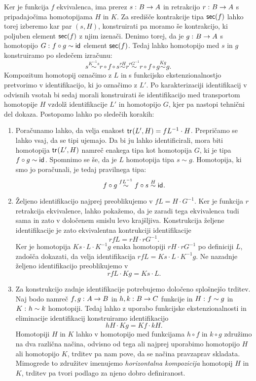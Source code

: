 \begin{dokaz}
  Ker je funkcija \(f\) ekvivalenca, ima prerez \(s \,\colon B \to A\) in retrakcijo \(r \,\colon B \to A\) s pripadajočima homotopijama \(H\) in \(K\). Za središče kontrakcije tipa \(\textnormal{\textsf{sec}}(f)\) lahko torej izberemo kar par \((s, H)\), konstruirati pa moramo še kontrakcijo, ki poljuben element \(\textnormal{\textsf{sec}}(f)\) z njim izenači.
  Denimo torej, da je \(g \,\colon B \to A\) s homotopijo \(G \,\colon f \circ g \sim \textnormal{\textsf{id}}_{}\) element \(\textnormal{\textsf{sec}}(f)\). Tedaj lahko homotopijo med \(s\) in \(g\) konstruiramo po sledečem izračunu:
  \[s \overset{K^{-1}s}{\sim} r \circ f \circ s \overset{rH}{\sim}
    r \overset{rG^{-1}}{\sim} r \circ f \circ g \overset{Kg}{\sim} g.\]
  Kompozitum homotopij označimo z \(L\) in s funkcijsko ekstenzionalnostjo pretvorimo v identifikacijo, ki jo označimo z \(L'\). Po karakterizaciji identifikacij v odvisnih vsotah bi sedaj morali konstruirati še identifikacijo med transportom homotopije \(H\) vzdolž identifikacije \(L'\) in homotopijo \(G\), kjer pa nastopi tehnični del dokaza. Postopamo lahko po sledečih korakih:
  \begin{enumerate}
  \item Poračunamo lahko, da velja enakost \(\textnormal{\textsf{tr}}_{}(L', H) = fL^{-1} \cdot H\). Prepričamo se lahko vsaj, da se tipi ujemajo. Da bi ju lahko identificirali, mora biti homotopija \(\textnormal{\textsf{tr}}_{}(L', H)\) namreč enakega tipa kot homotopija \(G\), ki je tipa \(f \circ g \sim \textnormal{\textsf{id}}_{}\). Spomnimo se še, da je \(L\) homotopija tipa \(s \sim g\). Homotopija, ki smo jo poračunali, je tedaj pravilnega tipa:
    \[f \circ g \overset{fL^{-1}}{\sim} f \circ s \overset{H}{\sim} \textnormal{\textsf{id}}_{}.\]

  \item Željeno identifikacijo najprej preoblikujemo v \(fL = H \cdot G^{-1}\). Ker je funkcija \(r\) retrakcija ekvivalence, lahko pokažemo, da je zaradi tega ekvivalenca tudi sama in zato v določenem smislu levo krajšljiva. Konstrukcija željene identifikacije je zato ekvivalentna kontrukciji identifikacije \[rfL = rH \cdot rG^{-1}.\]
    Ker je homotopija \(Ks \cdot L \cdot K^{-1}g\) enaka homotopiji \(rH \cdot rG^{-1}\) po definiciji \(L\), zadošča dokazati, da velja identifikacija \(rfL = Ks \cdot L \cdot K^{-1}g.\)
    Ne nazadnje željeno identifikacijo preoblikujemo v
    \[rfL \cdot Kg = Ks \cdot L.\]

  \item Za konstrukcijo zadnje identifikacije potrebujemo določeno splošnejšo trditev. Naj bodo namreč \(f, g \,\colon A \to B\) in \(h, k \,\colon B \to C\) funkcije in
    \(H \,\colon f \sim g\) in \(K \,\colon h \sim k\) homotopiji. Tedaj lahko z uporabo funkcijske ekstenzionalnosti in eliminacije identifikacij konstruiramo identifikacijo
    \[hH \cdot Kg = Kf \cdot kH.\]
    Homotopiji \(H\) in \(K\) lahko v homotopijo med funkcijama \(h \circ f\) in \(k \circ g\) združimo na dva različna načina, odvisno od tega ali najprej uporabimo homotopijo \(H\) ali homotopijo \(K\), trditev pa nam pove, da se načina pravzaprav skladata. Mimogrede to združitev imenujemo \emph{horizontalna kompozicija} homotopij \(H\) in \(K\), trditev pa tvori podlago za njeno dobro definiranost.


\end{enumerate}
\end{dokaz}
